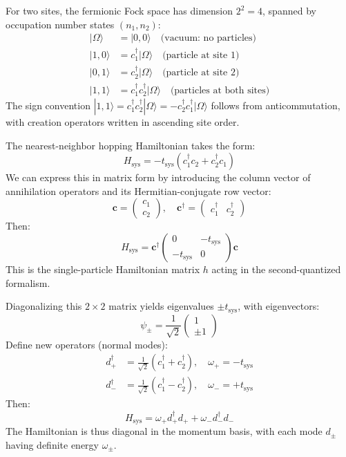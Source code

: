 \documentclass[12pt,oneside,openright]{report}
\theoremstyle{definition}
\theoremstyle{plain}
\theoremstyle{remark}
\begin{document}
For two sites, the fermionic Fock space has dimension $2^2 = 4$, spanned by occupation number 
states $(n_1, n_2)$:
\begin{align}
|\Omega\rangle &= |0,0\rangle \quad \text{(vacuum: no particles)} \\
|1,0\rangle &= c_1^\dagger |\Omega\rangle \quad \text{(particle at site 1)} \\
|0,1\rangle &= c_2^\dagger |\Omega\rangle \quad \text{(particle at site 2)} \\
|1,1\rangle &= c_1^\dagger c_2^\dagger |\Omega\rangle \quad \text{(particles at both sites)}
\end{align}
The sign convention $|1,1\rangle = c_1^\dagger c_2^\dagger |\Omega\rangle = -c_2^\dagger c_1^\dagger |\Omega\rangle$ 
follows from anticommutation, with creation operators written in ascending site order.

The nearest-neighbor hopping Hamiltonian takes the form:
\begin{equation}
H_{\mathrm{sys}} = -t_{\mathrm{sys}} (c_1^\dagger c_2 + c_2^\dagger c_1)
\end{equation}
We can express this in matrix form by introducing the column vector of annihilation operators and its Hermitian-conjugate row vector:
\begin{equation}
\mathbf{c} = \begin{pmatrix} c_1 \\ c_2 \end{pmatrix}, \quad
\mathbf{c}^{\dagger} = \begin{pmatrix} c_1^\dagger & c_2^\dagger \end{pmatrix}
\end{equation}
Then:
\begin{equation}
H_{\mathrm{sys}} = \mathbf{c}^\dagger \begin{pmatrix} 0 & -t_{\mathrm{sys}} \\ -t_{\mathrm{sys}} & 0 \end{pmatrix} \mathbf{c}
\end{equation}
This is the single-particle Hamiltonian matrix $h$ acting in the second-quantized formalism.

Diagonalizing this $2 \times 2$ matrix yields eigenvalues $\pm t_{\mathrm{sys}}$, with eigenvectors:
\begin{equation}
\psi_{\pm} = \frac{1}{\sqrt{2}} \begin{pmatrix} 1 \\ \pm 1 \end{pmatrix}
\end{equation}
Define new operators (normal modes):
\begin{align}
d_+^\dagger &= \frac{1}{\sqrt{2}}(c_1^\dagger + c_2^\dagger), \quad \omega_+ = -t_{\mathrm{sys}} \\
d_-^\dagger &= \frac{1}{\sqrt{2}}(c_1^\dagger - c_2^\dagger), \quad \omega_- = +t_{\mathrm{sys}}
\end{align}
Then:
\begin{equation}
H_{\mathrm{sys}} = \omega_+ d_+^\dagger d_+ + \omega_- d_-^\dagger d_-
\end{equation}
The Hamiltonian is thus diagonal in the momentum basis, with each mode $d_\pm$ having definite energy $\omega_\pm$.
\end{document}
